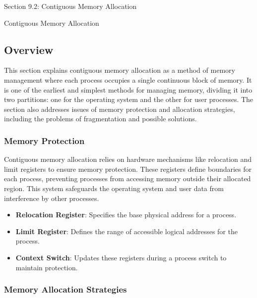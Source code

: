 \begin{notes}{Section 9.2: Contiguous Memory Allocation}
    \begin{notes}{Contiguous Memory Allocation}
        \subsection*{Overview}
        
        This section explains contiguous memory allocation as a method of memory management where each process occupies a single continuous block of memory. It is one of the earliest and simplest 
        methods for managing memory, dividing it into two partitions: one for the operating system and the other for user processes. The section also addresses issues of memory protection and 
        allocation strategies, including the problems of fragmentation and possible solutions.
    
        \subsubsection*{Memory Protection}
        
        Contiguous memory allocation relies on hardware mechanisms like relocation and limit registers to ensure memory protection. These registers define boundaries for each process, preventing 
        processes from accessing memory outside their allocated region. This system safeguards the operating system and user data from interference by other processes.
        
        \begin{highlight}
            \begin{itemize}
                \item \textbf{Relocation Register}: Specifies the base physical address for a process.
                \item \textbf{Limit Register}: Defines the range of accessible logical addresses for the process.
                \item \textbf{Context Switch}: Updates these registers during a process switch to maintain protection.
            \end{itemize}
        \end{highlight}
        
        \subsubsection*{Memory Allocation Strategies}
        

\end{notes}
\end{notes}
